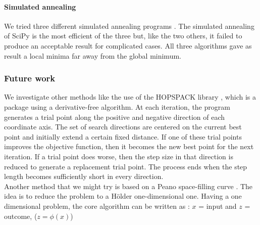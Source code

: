 \paragraph{Simulated annealing}
We tried three different simulated annealing programs \cite{scipy,wagner,asamin}.
The simulated annealing of SciPy\cite{scipy} is the most efficient of the
three but, like the two others, it failed to produce an acceptable result for 
complicated cases. All three algorithms gave as result a local minima far away
from the global minimum.

\subsubsection{Future work}
We investigate other methods like the use of the HOPSPACK library \cite{hopspack}, 
which is a package using a derivative-free algorithm. At each iteration, 
the program generates a trial point along the positive and negative direction 
of each coordinate axis. The set of search directions are centered on the 
current best point and initially extend a certain fixed distance. If one 
of these trial points improves the objective function, then it becomes the 
new best point for the next iteration. If a trial point does worse, then the 
step size in that direction is reduced to generate a replacement trial point. 
The process ends when the step length becomes sufficiently short in every 
direction.\\
Another method that we might try is based on a Peano space-filling curve 
\cite{livre}. The idea is to reduce the problem to a H\"{o}lder one-dimensional 
one. Having a one dimensional problem, the core algorithm can be written as :
$x$ = input and $z$ = outcome, ($z=\phi(x)$)
